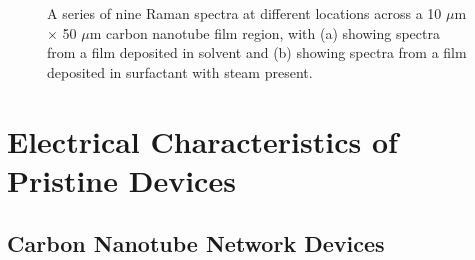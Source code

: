 \documentclass[
  a4paper,
]{scrbook}
\begin{document}
\begin{figure}
\begin{minipage}[t]{0.47\linewidth}
{{}

}

\subcaption{\label{fig-surfactant-deposited}}
\end{minipage}%

\caption{\label{fig-pristine-raman}A series of nine Raman spectra at
different locations across a 10 \(\mu\)m \(\times\) 50 \(\mu\)m carbon
nanotube film region, with (a) showing spectra from a film deposited in
solvent and (b) showing spectra from a film deposited in surfactant with
steam present.}

\end{figure}

\hypertarget{sec-pristine-electrical-characterisation}{%
\section{Electrical Characteristics of Pristine
Devices}\label{sec-pristine-electrical-characterisation}}

\hypertarget{carbon-nanotube-network-devices}{%
\subsection{Carbon Nanotube Network
Devices}\label{carbon-nanotube-network-devices}}
\end{document}

